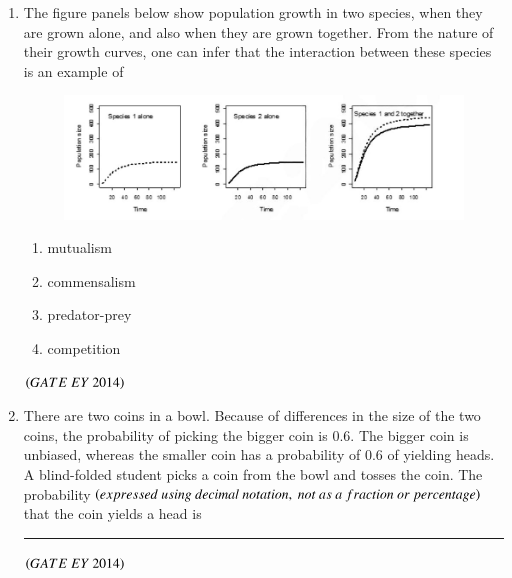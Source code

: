 \documentclass[journal]{IEEEtran}
\numberwithin{equation}{enumi}
\numberwithin{figure}{enumi}
\begin{document}
\begin{enumerate}
    \item The figure panels below show population growth in two species, when they are grown alone, and also when they are grown together. From the nature of their growth curves, one can infer that the interaction between these species is an example of
    \begin{figure}[H]
    \centering
    \includegraphics[width=0.8\columnwidth]{figs/11.png}
    \caption{}
    \label{fig:11}
   \end{figure}
    \begin{multicols}{2}
    \begin{enumerate}
        \item mutualism
        \item commensalism
        \item predator-prey
        \item competition
    \end{enumerate}
    \end{multicols}
    \hfill{$\brak{ GATE\ EY\ 2014}$}
    \bigskip

    \item There are two coins in a bowl. Because of differences in the size of the two coins, the probability of picking the bigger coin is $0.6$. The bigger coin is unbiased, whereas the smaller coin has a probability of $0.6$ of yielding heads. A blind-folded student picks a coin from the bowl and tosses the coin. The probability$\brak{expressed\ using\ decimal\ notation,\ not\ as\ a\ fraction\ or\ percentage}$ that the coin yields a head is \rule{3cm}{0.15mm}
    \hfill{$\brak{ GATE\ EY\ 2014}$}
    \bigskip
    

\end{enumerate}
\end{document}
